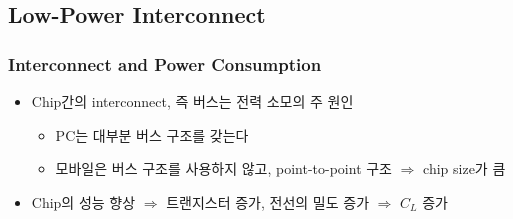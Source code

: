 \subsection{Low-Power Interconnect}

\subsubsection*{Interconnect and Power Consumption}
\begin{itemize}
    \item Chip간의 interconnect, 즉 버스는 전력 소모의 주 원인
    \begin{itemize}
        \item PC는 대부분 버스 구조를 갖는다
        \item 모바일은 버스 구조를 사용하지 않고, point-to-point 구조 $\Rightarrow$ chip size가 큼
    \end{itemize}
    \item Chip의 성능 향상 $\Rightarrow$ 트랜지스터 증가, 전선의 밀도 증가 $\Rightarrow$ $C_L$ 증가
\end{itemize}


